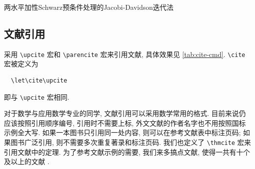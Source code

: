 \begin{algorithm}[htbp]
	\caption{两水平加性Schwarz预条件处理的Jacobi-Davidson迭代法}\label{alg:twolevel}
	\begin{algorithmic}
	  \EndWhile
	\end{algorithmic}
\end{algorithm}

\zhlipsum[1]

\subsection{文献引用}\label{sec:exm-bib}

采用 \verb|\upcite| 宏和 \verb|\parencite| 宏来引用文献, 具体效果见 \ref{tab:cite-cmd}. \verb|\cite| 宏被定义为
\begin{verbatim}
  \let\cite\upcite
\end{verbatim}
即与 \verb|\upcite| 宏相同.

对于数学与应用数学专业的同学, 文献引用可以采用数学常用的格式. 目前来说仍应该按照引用顺序编号, 引用时不需要上标, 外文文献的作者名字也不用按照国标示例全大写. 如果一本图书只引用同一处内容, 则可以在参考文献表中标注页码; 如果图书广泛引用, 则不需要多次重复著录和标注页码. 我们也定义了 \verb|\thmcite| 宏来引用文献中的定理. 为了参考文献示例的需要, 我们来多搞点文献, 使得一共有十个及以上的文献 \cite{atiyah_introduction_1969, herrlich_axiom_2006, jacobson_basic_1985, jacobson_basic_1989, zariski_commutative_1958, zariski_commutative_1960, ciarlet_linear_2013, flaherty_riemannian_1992, munkres_topology_2000, ahlfors_complex_1978, milne_algebraic_2017}.

